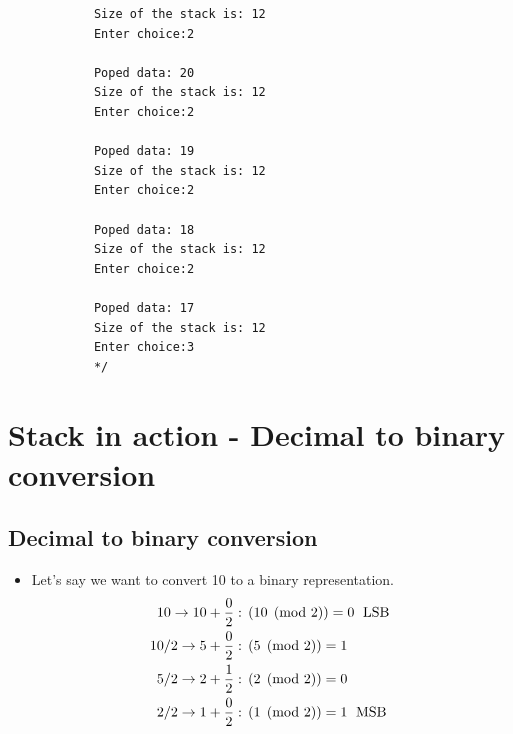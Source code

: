 \begin{itemize}
\begin{verbatim}
            Size of the stack is: 12
            Enter choice:2

            Poped data: 20
            Size of the stack is: 12
            Enter choice:2

            Poped data: 19
            Size of the stack is: 12
            Enter choice:2

            Poped data: 18
            Size of the stack is: 12
            Enter choice:2

            Poped data: 17
            Size of the stack is: 12
            Enter choice:3
            */
        \end{verbatim}
\end{itemize}

\section{Stack in action - Decimal to binary conversion}
\subsection{Decimal to binary conversion}
\begin{itemize}
    \item Let's say we want to convert 10 to a binary representation. 
        \begin{align*}
            10  \rightarrow 10+\frac{0}{2}:\; &  \left(10 \pmod{2}\right)  =  0 \;\text{ LSB }\\ 
            10/2\rightarrow 5+\frac{0}{2}:\;  &  \left(5 \pmod{2}\right)  = 1 \\  
            5/2 \rightarrow 2+\frac{1}{2}:\;  &  \left(2  \pmod{2}\right)  = 0 \\ 
            2/2 \rightarrow 1+\frac{0}{2}:\;  &  \left(1 \pmod{2}\right)  = 1 \;\text{ MSB }\\
        \end{align*}
\end{itemize}

